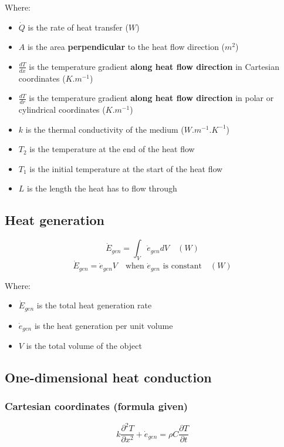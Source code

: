 \documentclass[11pt]{article}
\begin{document}
Where:
\begin{itemize}
\item \(\dot{Q}\) is the rate of heat transfer (\(\unit{W}\))
\item \(A\) is the area \textbf{perpendicular} to the heat flow direction (\(\unit{m^2}\))
\item \(\frac{dT}{dx}\) is the temperature gradient \textbf{along heat flow direction} in Cartesian coordinates (\(\unit{K.m^{-1}}\))
\item \(\frac{dT}{dr}\) is the temperature gradient \textbf{along heat flow direction} in polar or cylindrical coordinates (\(\unit{K.m^{-1}}\))
\item \(k\) is the thermal conductivity of the medium (\(\unit{W.m^{-1}.K^{-1}}\))
\item \(T_2\) is the temperature at the end of the heat flow
\item \(T_1\) is the initial temperature at the start of the heat flow
\item \(L\) is the length the heat has to flow through
\end{itemize}

\subsection{Heat generation}
\label{sec:org54b25f2}
\[\dot{E}_{gen} = \int_V \dot{e}_{gen} dV \quad (\unit{W})\]
\[\dot{E}_{gen} = \dot{e}_{gen} V \quad \text{when } \dot{e}_{gen} \text{ is constant} \quad (\unit{W})\]

Where:
\begin{itemize}
\item \(\dot{E}_{gen}\) is the total heat generation rate
\item \(\dot{e}_{gen}\) is the heat generation per unit volume
\item \(V\) is the total volume of the object
\end{itemize}

\subsection{One-dimensional heat conduction}
\label{sec:orgf6a7b7e}

\subsubsection{Cartesian coordinates (formula given)}
\label{sec:org9a45a08}
\[k \frac{\partial^2 T}{\partial x^2} + \dot{e}_{gen} = \rho C \frac{\partial T}{\partial t}\]
\end{document}
